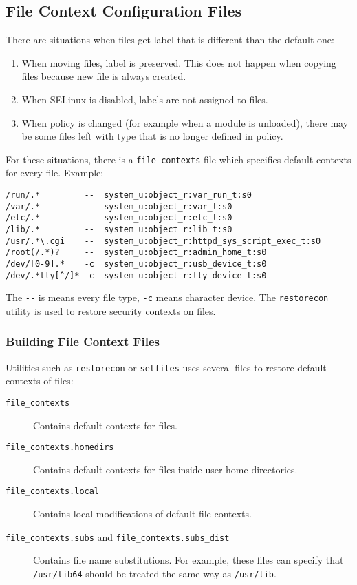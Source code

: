 \subsection{File Context Configuration Files}
There are situations when files get label that is different than the default
one:
\begin{enumerate}
    \item When moving files, label is preserved. This does not happen when
        copying files because new file is always created.
    \item When SELinux is disabled, labels are not assigned to files.
    \item When policy is changed (for example when a module is unloaded), there
        may be some files left with type that is no longer defined in policy.
\end{enumerate}
For these situations, there is a \texttt{file\_contexts} file which specifies
default contexts for every file. Example:
\begin{lstlisting}
/run/.*         --  system_u:object_r:var_run_t:s0
/var/.*	        --  system_u:object_r:var_t:s0
/etc/.*	        --  system_u:object_r:etc_t:s0
/lib/.*	        --  system_u:object_r:lib_t:s0
/usr/.*\.cgi    --  system_u:object_r:httpd_sys_script_exec_t:s0
/root(/.*)?     --  system_u:object_r:admin_home_t:s0
/dev/[0-9].*    -c  system_u:object_r:usb_device_t:s0
/dev/.*tty[^/]* -c  system_u:object_r:tty_device_t:s0
\end{lstlisting}
The \texttt{-{}-} is means every file type, \texttt{-c} means character device.
The \texttt{restorecon} utility is used to restore security contexts on files.

\subsubsection{Building File Context Files}
Utilities such as \texttt{restorecon} or \texttt{setfiles} uses several files to
restore default contexts of files:
\begin{description}
    \item [\texttt{file\_contexts}] Contains default contexts for files.
    \item [\texttt{file\_contexts.homedirs}] Contains default contexts for files
        inside user home directories.
    \item [\texttt{file\_contexts.local}] Contains local modifications of
        default file contexts.
    \item [\texttt{file\_contexts.subs} and \texttt{file\_contexts.subs\_dist}]
        Contains file name substitutions. For example, these files can specify
        that \texttt{/usr/lib64} should be treated the same way as
        \texttt{/usr/lib}.
\end{description}

